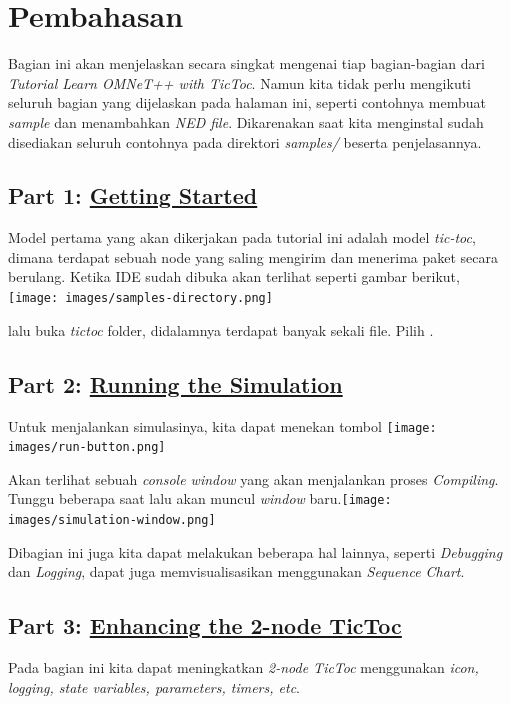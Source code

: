 \documentclass[conference]{IEEEtran}
\begin{document}
\section{Pembahasan}
Bagian ini akan menjelaskan secara singkat mengenai tiap bagian-bagian dari \textit{Tutorial Learn OMNeT++ with TicToc}. Namun kita tidak perlu mengikuti seluruh bagian yang dijelaskan pada halaman ini, seperti contohnya membuat \textit{sample} dan menambahkan \textit{NED file}. Dikarenakan saat kita menginstal sudah disediakan seluruh contohnya pada direktori \textit{samples/} beserta penjelasannya.

\subsection{Part 1: \href{https://docs.omnetpp.org/tutorials/tictoc/part1/}{Getting Started}}
Model pertama yang akan dikerjakan pada tutorial ini adalah model \textit{tic-toc}, dimana terdapat sebuah node yang saling mengirim dan menerima paket secara berulang. Ketika IDE sudah dibuka akan terlihat seperti gambar berikut,
\texttt{[image: images/samples-directory.png]}


lalu buka \textit{tictoc} folder, didalamnya terdapat banyak sekali file. Pilih .

\subsection{Part 2: \href{https://docs.omnetpp.org/tutorials/tictoc/part2/}{Running the Simulation}}
Untuk menjalankan simulasinya, kita dapat menekan tombol \break
\texttt{[image: images/run-button.png]}

Akan terlihat sebuah \textit{console window} yang akan menjalankan proses \textit{Compiling}. Tunggu beberapa saat lalu akan muncul \textit{window} baru.\break \texttt{[image: images/simulation-window.png]}

Dibagian ini juga kita dapat melakukan beberapa hal lainnya, seperti \textit{Debugging} dan \textit{Logging}, dapat juga memvisualisasikan menggunakan \textit{Sequence Chart}.

\subsection{Part 3: \href{https://docs.omnetpp.org/tutorials/tictoc/part3/}{Enhancing the 2-node TicToc}}
Pada bagian ini kita dapat meningkatkan \textit{2-node TicToc} menggunakan \textit{icon, logging, state variables, parameters, timers, etc}.
\end{document}
